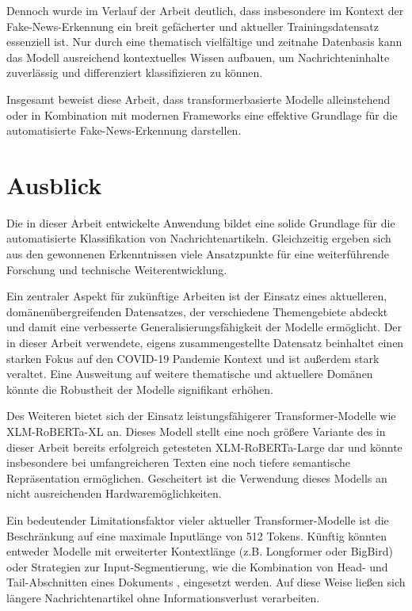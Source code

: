 Dennoch wurde im Verlauf der Arbeit deutlich, dass insbesondere im Kontext der Fake-News-Erkennung ein breit gefächerter und aktueller Trainingsdatensatz essenziell ist.
Nur durch eine thematisch vielfältige und zeitnahe Datenbasis kann das Modell ausreichend kontextuelles Wissen aufbauen, um Nachrichteninhalte zuverlässig und differenziert 
klassifizieren zu können.

Insgesamt beweist diese Arbeit, dass transformerbasierte Modelle alleinstehend oder in Kombination mit modernen Frameworks eine effektive Grundlage 
für die automatisierte Fake-News-Erkennung darstellen.

\chapter{Ausblick}
\label{chap:ausblick}

Die in dieser Arbeit entwickelte Anwendung bildet eine solide Grundlage für die automatisierte Klassifikation von Nachrichtenartikeln. 
Gleichzeitig ergeben sich aus den gewonnenen Erkenntnissen viele Ansatzpunkte für eine weiterführende Forschung und technische Weiterentwicklung.

Ein zentraler Aspekt für zukünftige Arbeiten ist der Einsatz eines aktuelleren, domänenübergreifenden Datensatzes, der verschiedene Themengebiete abdeckt 
und damit eine verbesserte Generalisierungsfähigkeit der Modelle ermöglicht. Der in dieser Arbeit verwendete, eigens zusammengestellte Datensatz 
beinhaltet einen starken Fokus auf den COVID-19 Pandemie Kontext und ist außerdem stark veraltet. 
Eine Ausweitung auf weitere thematische und aktuellere Domänen könnte die Robustheit der Modelle signifikant erhöhen.

Des Weiteren bietet sich der Einsatz leistungsfähigerer Transformer-Modelle wie XLM-RoBERTa-XL an. Dieses Modell stellt eine noch größere Variante des in 
dieser Arbeit bereits erfolgreich getesteten XLM-RoBERTa-Large dar und könnte insbesondere bei umfangreicheren Texten eine noch tiefere semantische 
Repräsentation ermöglichen. Gescheitert ist die Verwendung dieses Modells an nicht ausreichenden Hardwaremöglichkeiten.

Ein bedeutender Limitationsfaktor vieler aktueller Transformer-Modelle ist die Beschränkung auf eine maximale Inputlänge von 512 Tokens. 
Künftig könnten entweder Modelle mit erweiterter Kontextlänge (z.B. Longformer oder BigBird) oder Strategien zur Input-Segmentierung, 
wie die Kombination von Head- und Tail-Abschnitten eines Dokuments \cite{sun2020finetuneberttextclassification}, eingesetzt werden. 
Auf diese Weise ließen sich längere Nachrichtenartikel ohne Informationsverlust verarbeiten.

